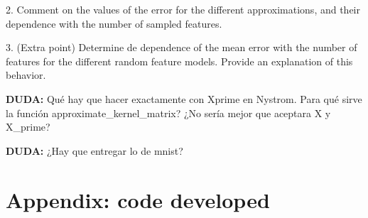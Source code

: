 \documentclass[11pt]{article}
\begin{document}
2. Comment on the values of the error for the different approximations, and their dependence with the number of sampled features.

3. (Extra point) Determine de dependence of the mean error with the number of features for the different random feature models. Provide an explanation of this behavior.

\textbf{DUDA:} Qué hay que hacer exactamente con Xprime en Nystrom. Para qué sirve la función approximate\_kernel\_matrix? ¿No sería mejor que aceptara X y X\_prime?

\textbf{DUDA:} ¿Hay que entregar lo de mnist?

\section*{Appendix: code developed}
\end{document}
